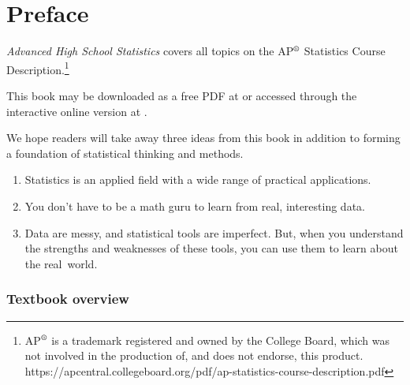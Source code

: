 \chapter*{Preface\vspace{-6mm}}


\noindent \emph{Advanced High School Statistics} covers all topics on the AP$^{\text{\textregistered}}$ Statistics Course Description.\footnote{AP$^{\text{\textregistered}}$ is a trademark registered and owned by the College Board, which was not involved in the production of, and does not endorse, this product.  https://apcentral.collegeboard.org/pdf/ap-statistics-course-description.pdf }
\vspace{3mm}

\noindent 
This book may be downloaded as a free PDF at  or accessed through the interactive online version at .
\vspace{3mm}

\noindent We hope readers will take away three ideas from this book in addition to forming a foundation of statistical thinking and methods.\vspace{-1mm}
\begin{enumerate}
\setlength{\itemsep}{0mm}
\item[(1)] Statistics is an applied field with a wide range of practical applications.
\item[(2)] You don't have to be a math guru to learn from real, interesting data.
\item[(3)] Data are messy, and statistical tools are imperfect. But, when you understand the strengths and weaknesses of these tools, you can use them to learn about the real~world.
\end{enumerate}


\subsection*{Textbook overview}

